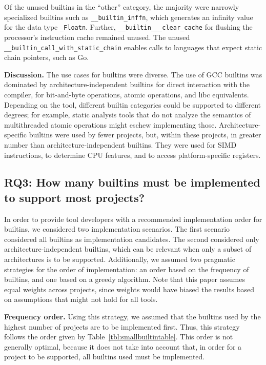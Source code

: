 \documentclass[sigconf,screen]{acmart}
\renewcommand{\paragraph}[1]{\textbf{#1}}
\newcommand\code[1]{\texttt{#1}}
\begin{document}
Of the unused builtins in the ``other'' category, the majority were narrowly specialized builtins such as \code{\_\_builtin\_inffn}, which generates an infinity value for the data type \code{\_Floatn}.
Further, \code{\_\_builtin\_\_\_clear\_cache} for flushing the processor's instruction cache remained unused.
The unused \code{\_\_builtin\_call\_with\_static\_chain} enables calls to languages that expect static chain pointers, such as Go.

\paragraph{Discussion.}
The use cases for builtins were diverse.
The use of GCC builtins was dominated by architecture-independent builtins for direct interaction with the compiler, for bit-and-byte operations, atomic operations, and libc equivalents.
Depending on the tool, different builtin categories could be supported to different degrees; for example, static analysis tools that do not analyze the semantics of multithreaded atomic operations might eschew implementing those.
Architecture-specific builtins were used by fewer projects, but, within these projects, in greater number than architecture-independent builtins.
They were used for SIMD instructions, to determine CPU features, and to access platform-specific registers.

\subsection{RQ3: How many builtins must be implemented to support most projects?}
\label{sec:builtinsupport}

In order to provide tool developers with a recommended implementation order for builtins, we considered two implementation scenarios.
The first scenario considered all builtins as implementation candidates.
The second considered only architecture-independent builtins, which can be relevant when only a subset of architectures is to be supported.
Additionally, we assumed two pragmatic strategies for the order of implementation: an order based on the frequency of builtins, and one based on a greedy algorithm.
Note that this paper assumes equal weights across projects, since weights would have biased the results based on assumptions that might not hold for all tools.

\paragraph{Frequency order.}
Using this strategy, we assumed that the builtins used by the highest number of projects are to be implemented first.
Thus, this strategy follows the order given by Table~\ref{tbl:smallbuiltintable}.
This order is not generally optimal, because it does not take into account that, in order for a project to be supported, all builtins used must be implemented.
\end{document}
